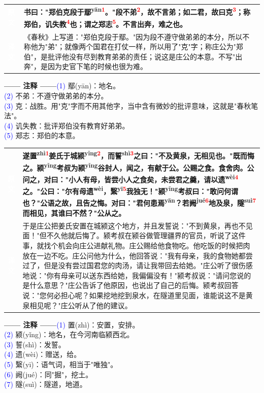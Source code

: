\documentclass[a4paper,12pt]{ctexart}
\makeatletter
\newcommand{\ruby}[2]{#1\textsuperscript{#2}}
\newlength{\colA}\setlength{\colA}{0.06\textwidth}
\newlength{\colB}\setlength{\colB}{0.64\textwidth}
\newlength{\colC}\setlength{\colC}{0.26\textwidth}
\newcommand{\sectab}[3]{%
  \noindent
  \begin{minipage}[c]{\dimexpr\colA+\colB+2\tabcolsep\relax}
  \begin{tabular}{@{}p{\colA}p{\colB}@{}}
  \sideyuan  & {\large\bfseries #1} \\
  \sideyiwen & {\large #2} \\
  \end{tabular}
  \end{minipage}
  \hfill
  \begin{minipage}[c]{\colC}
  {\labelann\vspace{0.1cm}}#3
  \end{minipage}
  \par
}
\newcommand{\sideyuan}{\colorbox{blue!70!black}{\textcolor{white}{\normalsize\textbf{原文}}}}
\newcommand{\sideyiwen}{\colorbox{green!60!black}{\textcolor{white}{\normalsize\textbf{译文}}}}
\newcommand{\labelann}{\textcolor{orange!80!black}{\small\textbf{—— 注释 ——}}}
\newcommand{\refmark}[1]{\textsuperscript{\textcolor{red}{#1}}}
\makeatother
\begin{document}
\vspace{0.3cm}
\sectab{书曰："郑伯克段于\ruby{鄢}{yān}\refmark{1}。"段不弟\refmark{2}，故不言弟；如二君，故曰克\refmark{3}；称郑伯，讥失教\refmark{4}也；谓之郑志\refmark{5}。不言出奔，难之也。}{《春秋》上写道："郑伯克段于鄢。"因为段不遵守做弟弟的本分，所以不称他为"弟"；就像两个国君在打仗一样，所以用了"克"字；称庄公为"郑伯"，是批评他没有尽到教育弟弟的责任；说这是庄公的本意。不写"出奔"，是因为史官下笔的时候也很为难。}{{\small \textcolor{blue}{(1)} 鄢(yān)：地名。}\\[0.1cm]{\small \textcolor{blue}{(2)} 不弟：不遵守做弟弟的本分。}\\[0.1cm]{\small \textcolor{blue}{(3)} 克：战胜。用"克"字而不用其他字，当中含有微妙的批评意味，这就是"春秋笔法"。}\\[0.1cm]{\small \textcolor{blue}{(4)} 讥失教：批评郑伯没有教育好弟弟。}\\[0.1cm]{\small \textcolor{blue}{(5)} 郑志：郑伯的本意。}}

\vspace{0.3cm}
\sectab{遂\ruby{置}{zhì}\refmark{1}姜氏于城\ruby{颍}{yǐng}\refmark{2}，而\ruby{誓}{shì}\refmark{3}之曰："不及黄泉，无相见也。"既而悔之。\ruby{颍}{yǐng}考叔为\ruby{颍}{yǐng}谷封人，闻之，有献于公。公赐之食。食舍肉。公问之，对曰："小人有母，皆尝小人之食矣，未尝君之羹，请以\ruby{遗}{wèi}\refmark{4}之。"公曰："尔有母\ruby{遗}{wèi}，\ruby{繄}{yī}\refmark{5}我独无！"\ruby{颍}{yǐng}考叔曰："敢问何谓也？"公语之故，且告之悔。对曰："君何患\ruby{焉}{yān}？若\ruby{阙}{jué}\refmark{6}地及泉，\ruby{隧}{suì}\refmark{7}而相见，其谁曰不然？"公从之。}{于是庄公把姜氏安置在城颍这个地方，并且发誓说："不到黄泉，再也不见面！"但不久他就后悔了。颍考叔在颍谷做管理疆界的官员，听说了这件事，就找个机会向庄公进献礼物。庄公赐给他食物吃。他吃饭的时候把肉放在一边不吃。庄公问他为什么，他回答说："我有母亲，我的食物她都尝过了，但是没有尝过国君您的肉汤，请让我带回去给她。"庄公听了很伤感地说："你有母亲可以送东西给她，我偏偏没有！"颍考叔说："请问您说的是什么意思？"庄公告诉了他原因，也说出了自己的后悔。颍考叔回答说："您何必担心呢？如果挖地挖到泉水，在隧道里见面，谁能说这不是黄泉相见呢？"庄公听从了他的建议。}{{\small \textcolor{blue}{(1)} 置(zhì)：安置，安排。}\\[0.1cm]{\small \textcolor{blue}{(2)} 颍(yǐng)：地名，在今河南临颍西北。}\\[0.1cm]{\small \textcolor{blue}{(3)} 誓(shì)：发誓。}\\[0.1cm]{\small \textcolor{blue}{(4)} 遗(wèi)：赠送，给。}\\[0.1cm]{\small \textcolor{blue}{(5)} 繄(yī)：语气词，相当于"唯独"。}\\[0.1cm]{\small \textcolor{blue}{(6)} 阙(jué)：同"掘"，挖土。}\\[0.1cm]{\small \textcolor{blue}{(7)} 隧(suì)：隧道，地道。}}
\end{document}
